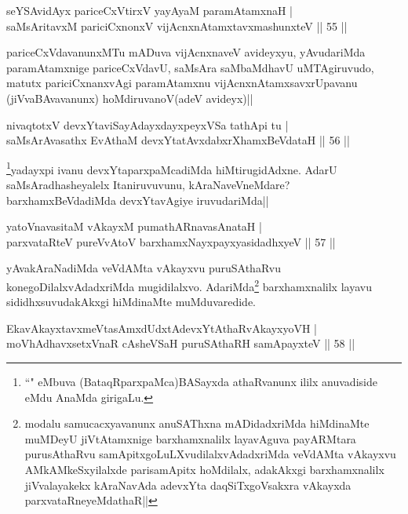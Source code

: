 
\begin{shl}
seYSA\s vidAyx pariceCxVtirxV yayA\s yaM paramAtamxnaH |\\
saMsAritavxM pariciCxnonxV vijAcnxnAtamxtavxmashunxteV \hfill || 55 ||
\end{shl}

\begin{artha}
pariceCxVdavanunxMTu mADuva vijAcnxnaveV avideyxyu, yAvudariMda paramAtamxnige 
pariceCxVdavU, saMsAra saMbaMdhavU uMTAgiruvudo, matutx pariciCxnanxvAgi paramAtamxnu 
vijAcnxnAtamxsavxrUpavanu (jiVvaBAvavanunx) hoMdiruvanoV(adeV avideyx)||
\end{artha}

\begin{shl}
nivaqtotxV devxYtaviSayAdayxdayxpeyxVSa tathA\s pi tu |\\
saMsArAvasathx EvAthaM devxYtatAvxdabxrXhamxBeVdataH \hfill || 56 ||
\end{shl}

\begin{artha}
\footnote{``\stext" eMbuva (BataqRparxpaMca)BASayxda athaRvanunx ililx anuvadiside eMdu AnaMda girigaLu.}yadayxpi ivanu devxYtaparxpaMcadiMda hiMtirugidAdxne. AdarU saMsAradhasheyalelx Itaniruvuvunu, kAraNaveVneMdare? barxhamxBeVdadiMda devxYtavAgiye iruvudariMda||
\end{artha}

\begin{shl}
yatoV\s navasitaM vAkayxM pumathARnavasAnataH |\\
parxvataRteV pureVvAtoV barxhamxNayxpayxyasidadhxyeV \hfill || 57 ||
\end{shl}

\begin{artha}
yAvakAraNadiMda veVdAMta vAkayxvu puruSAthaRvu konegoDilalxvAdadxriMda mugidilalxvo. AdariMda\footnote{modalu samucacxyavanunx anuSAThxna mADidadxriMda hiMdinaMte muMDeyU jiVtAtamxnige barxhamxnalilx layavAguva payARMtara purusAthaRvu samApitxgoLuLXvudilalxvAdadxriMda veVdAMta vAkayxvu AMkAMkeSxyilalxde parisamApitx hoMdilalx, adakAkxgi barxhamxnalilx jiVvalayakekx kAraNavAda adevxYta daqSiTxgoVsakxra vAkayxda parxvataRneyeMdathaR||} barxhamxnalilx layavu sididhxsuvudakAkxgi hiMdinaMte muMduvaredide.
\end{artha}

\begin{shl}
EkavAkayxtavxmeVtasAmxdUdxtAdevxYtAthaRvAkayxyoVH |\\
moVhAdhavxsetxVnaR cAsheVSaH puruSAthaRH samApayxteV \hfill || 58 ||
\end{shl}

